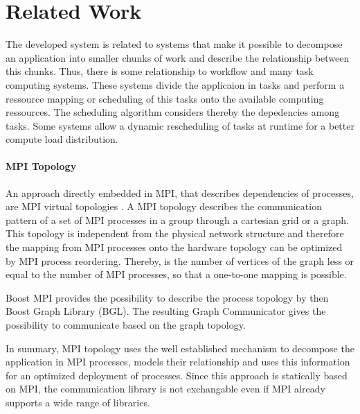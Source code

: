 \section{Related Work}
The developed system is related to systems that make it possible to
decompose an application into smaller chunks of work and describe the
relationship between this chunks.  Thus, there is some relationship to
workflow and many task computing systems. These systems divide the
applicaion in tasks and perform a ressource mapping or scheduling of
this tasks onto the available computing ressources. The scheduling
algorithm considers thereby the depedencies among tasks. Some systems
allow a dynamic rescheduling of tasks at runtime for a better compute
load distribution.

\paragraph*{MPI Topology}
An approach directly embedded in MPI, that describes dependencies of
processes, are MPI virtual topologies \cite{ref:mpi_topology}. A MPI
topology describes the communication pattern of a set of MPI processes
in a group through a cartesian grid or a graph.  This topology is
independent from the physical network structure and therefore the
mapping from MPI processes onto the hardware topology can be optimized
by MPI process reordering. Thereby, is the number of vertices of the
graph less or equal to the number of MPI processes, so that a
one-to-one mapping is possible.

Boost MPI provides the possibility to describe the process topology by
then Boost Graph Library (BGL)\cite{ref:boost_bgl}.  The resulting
Graph Communicator \cite{ref:boost_graph_communicator} gives the
possibility to communicate based on the graph topology.

In summary, MPI topology uses the well established mechanism to
decompose the application in MPI processes, models their relationship
and uses this information for an optimized deployment of processes.
Since this approach is statically based on MPI, the communication
library is not exchangable even if MPI already supports a wide range
of libraries.

